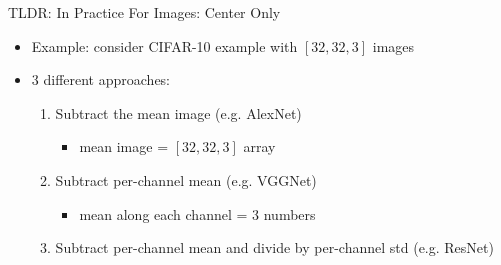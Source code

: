 \documentclass[serif, aspectratio=169]{beamer}
\begin{document}
\begin{frame}{TLDR: In Practice For Images: Center Only}
	\begin{itemize}
		\item Example: consider CIFAR-10 example with $[32,32,3]$ images
		\item 3 different approaches:
		\begin{enumerate}
		\item Subtract the mean image (e.g. AlexNet)
			\begin{itemize}
				\item mean image = $[32,32,3]$ array
			\end{itemize}
		\item Subtract per-channel mean (e.g. VGGNet)
			\begin{itemize}
				\item mean along each channel = 3 numbers
			\end{itemize}		
		\item Subtract per-channel mean and divide by per-channel std (e.g. ResNet)
		\end{enumerate}
	\end{itemize}
\end{frame}
\end{document}
